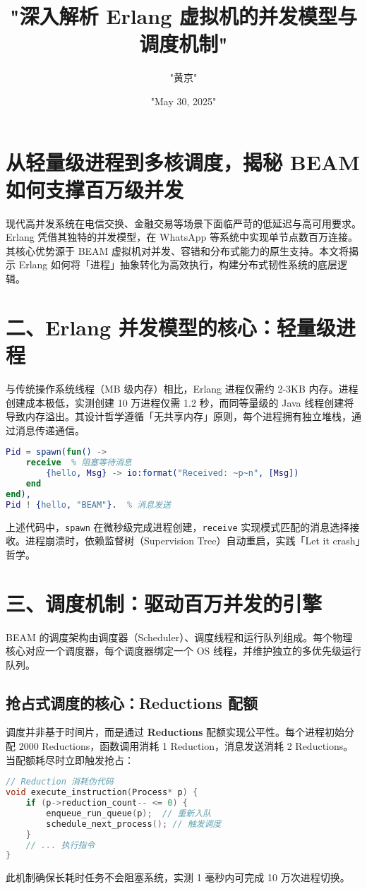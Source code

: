 \title{"深入解析 Erlang 虚拟机的并发模型与调度机制"}
\author{"黄京"}
\date{"May 30, 2025"}
\maketitle
\chapter{从轻量级进程到多核调度，揭秘 BEAM 如何支撑百万级并发}
现代高并发系统在电信交换、金融交易等场景下面临严苛的低延迟与高可用要求。Erlang 凭借其独特的并发模型，在 WhatsApp 等系统中实现单节点数百万连接。其核心优势源于 BEAM 虚拟机对并发、容错和分布式能力的原生支持。本文将揭示 Erlang 如何将「进程」抽象转化为高效执行，构建分布式韧性系统的底层逻辑。\par
\chapter{二、Erlang 并发模型的核心：轻量级进程}
与传统操作系统线程（MB 级内存）相比，Erlang 进程仅需约 2-3KB 内存。进程创建成本极低，实测创建 10 万进程仅需 1.2 秒，而同等量级的 Java 线程创建将导致内存溢出。其设计哲学遵循「无共享内存」原则，每个进程拥有独立堆栈，通过消息传递通信。\par
\begin{lstlisting}[language=erlang]
% 进程创建示例
Pid = spawn(fun() -> 
    receive  % 阻塞等待消息
        {hello, Msg} -> io:format("Received: ~p~n", [Msg])
    end
end),
Pid ! {hello, "BEAM"}.  % 消息发送
\end{lstlisting}
上述代码中，\verb!spawn! 在微秒级完成进程创建，\verb!receive! 实现模式匹配的消息选择接收。进程崩溃时，依赖监督树（Supervision Tree）自动重启，实践「Let it crash」哲学。\par
\chapter{三、调度机制：驱动百万并发的引擎}
BEAM 的调度架构由调度器（Scheduler）、调度线程和运行队列组成。每个物理核心对应一个调度器，每个调度器绑定一个 OS 线程，并维护独立的多优先级运行队列。\par
\section{抢占式调度的核心：Reductions 配额}
调度并非基于时间片，而是通过 \textbf{Reductions} 配额实现公平性。每个进程初始分配 2000 Reductions，函数调用消耗 1 Reduction，消息发送消耗 2 Reductions。当配额耗尽时立即触发抢占：\par
\begin{lstlisting}[language=c]
// Reduction 消耗伪代码
void execute_instruction(Process* p) {
    if (p->reduction_count-- <= 0) { 
        enqueue_run_queue(p);  // 重新入队
        schedule_next_process(); // 触发调度
    }
    // ... 执行指令
}
\end{lstlisting}
此机制确保长耗时任务不会阻塞系统，实测 1 毫秒内可完成 10 万次进程切换。\par
